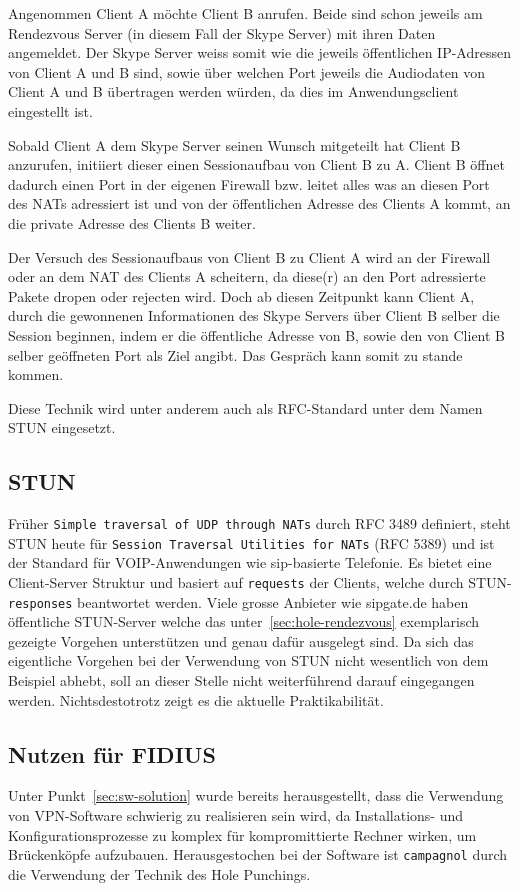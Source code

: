 Angenommen Client A möchte Client B anrufen. Beide sind schon jeweils
am Rendezvous Server (in diesem Fall der Skype Server) mit ihren Daten
angemeldet. Der Skype Server weiss somit wie die jeweils öffentlichen
IP-Adressen von Client A und B sind, sowie über welchen Port jeweils
die Audiodaten von Client A und B übertragen werden würden, da dies im
Anwendungsclient eingestellt ist.

Sobald Client A dem Skype Server seinen Wunsch mitgeteilt hat Client B
anzurufen, initiiert dieser einen Sessionaufbau von Client B zu
A. Client B öffnet dadurch einen Port in der eigenen Firewall
bzw. leitet alles was an diesen Port des NATs adressiert ist und von
der öffentlichen Adresse des Clients A kommt, an die private Adresse
des Clients B weiter.

Der Versuch des Sessionaufbaus von Client B zu Client A wird an der
Firewall oder an dem NAT des Clients A scheitern, da diese(r) an den
Port adressierte Pakete dropen oder rejecten wird. Doch ab diesen
Zeitpunkt kann Client A, durch die gewonnenen Informationen des Skype
Servers über Client B selber die Session beginnen, indem er die
öffentliche Adresse von B, sowie den von Client B selber geöffneten
Port als Ziel angibt. Das Gespräch kann somit zu stande kommen.

Diese Technik wird unter anderem auch als RFC-Standard unter dem Namen
STUN eingesetzt.

\subsection{STUN}
\label{sec:stun} Früher \texttt{Simple traversal of UDP through NATs}
durch RFC 3489 definiert, steht STUN heute für \texttt{Session
Traversal Utilities for NATs} (RFC 5389) und ist der Standard für
VOIP-Anwendungen wie sip-basierte Telefonie. Es bietet eine
Client-Server Struktur und basiert auf \texttt{requests} der Clients,
welche durch STUN-\texttt{responses} beantwortet werden. Viele grosse
Anbieter wie sipgate.de haben öffentliche STUN-Server welche das
unter~\ref{sec:hole-rendezvous} exemplarisch gezeigte Vorgehen
unterstützen und genau dafür ausgelegt sind. Da sich das eigentliche
Vorgehen bei der Verwendung von STUN nicht wesentlich von dem Beispiel
abhebt, soll an dieser Stelle nicht weiterführend darauf eingegangen
werden. Nichtsdestotrotz zeigt es die aktuelle Praktikabilität.

\subsection{Nutzen für FIDIUS} Unter Punkt~\ref{sec:sw-solution} wurde
bereits herausgestellt, dass die Verwendung von VPN-Software schwierig
zu realisieren sein wird, da Installations- und Konfigurationsprozesse
zu komplex für kompromittierte Rechner wirken, um Brückenköpfe
aufzubauen. Herausgestochen bei der Software ist \texttt{campagnol}
durch die Verwendung der Technik des Hole Punchings.

